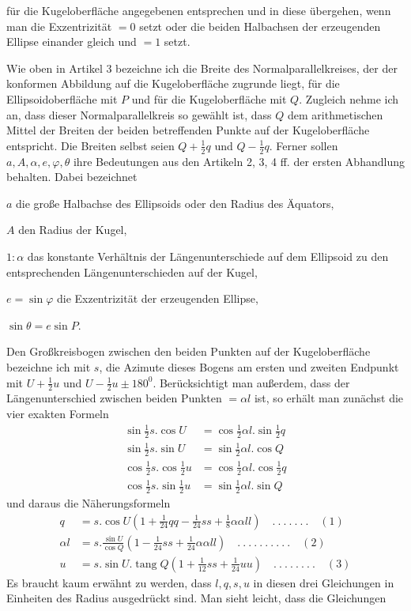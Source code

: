 %
für die Kugeloberfläche angegebenen entsprechen und in diese übergehen, wenn man die Exzentrizität \(=0\) setzt oder die beiden Halbachsen der erzeugenden Ellipse einander gleich und \(=1\) setzt.

Wie oben in Artikel 3 bezeichne ich die Breite des Normalparallelkreises, der der konformen Abbildung auf die Kugeloberfläche zugrunde liegt, für die Ellipsoidoberfläche mit \(P\) und für die Kugeloberfläche mit \(Q\). Zugleich nehme ich an, dass dieser Normalparallelkreis so gewählt ist, dass \(Q\) dem arithmetischen Mittel der Breiten der beiden betreffenden Punkte auf der Kugeloberfläche entspricht. Die Breiten selbst seien \(Q+\frac12q\) und \(Q-\frac12q\). Ferner sollen \(a,A,\alpha,e,\varphi,\theta\) ihre Bedeutungen aus den Artikeln 2, 3, 4 ff. der ersten Abhandlung behalten. Dabei bezeichnet
\begin{list}{}{\setlength{\leftmargin}{1em}\setlength{\itemindent}{0pt}\setlength{\itemsep}{0pt}\setlength{\parsep}{0pt}}
\item \(a\) die große Halbachse des Ellipsoids oder den Radius des Äquators,
\item \(A\) den Radius der Kugel,
\item \(1:\alpha\) das konstante Verhältnis der Längenunterschiede auf dem Ellipsoid zu den entsprechenden Längenunterschieden auf der Kugel,
\item \(e=\sin\varphi\) die Exzentrizität der erzeugenden Ellipse,
\item \(\sin\theta=e\sin P\).
\end{list}

\indent Den Großkreisbogen zwischen den beiden Punkten auf der Kugeloberfläche bezeichne ich mit \(s\), die Azimute dieses Bogens am ersten und zweiten Endpunkt mit \(U+\frac12u\) und \(U-\frac12u\pm180^0\). Berücksichtigt man außerdem, dass der Längenunterschied zwischen beiden Punkten \(=\alpha l\) ist, so erhält man zunächst die vier exakten Formeln
\[
\begin{aligned}
\sin\tfrac12s\mathord{.}\cos U&=\cos\tfrac12\alpha l\mathord{.}\sin\tfrac12q\\
\sin\tfrac12s\mathord{.}\sin U&=\sin\tfrac12\alpha l\mathord{.}\cos Q\\
\cos\tfrac12s\mathord{.}\cos\tfrac12u&=\cos\tfrac12\alpha l\mathord{.}\cos\tfrac12q\\
\cos\tfrac12s\mathord{.}\sin\tfrac12u&=\sin\tfrac12\alpha l\mathord{.}\sin Q
\end{aligned}
\]
und daraus die Näherungsformeln
\[
\begin{aligned}
q&=s\mathord{.}\cos U(1+\tfrac1{24}qq-\tfrac1{24}ss+\tfrac18\alpha\alpha ll)\quad .\ .\ .\ .\ .\ .\ .\quad(1)\\
\alpha l&=s\mathord{.}\frac{\sin U}{\cos Q}(1-\tfrac1{24}ss+\tfrac1{24}\alpha\alpha ll)\quad .\ .\ .\ .\ .\ .\ .\ .\ .\ .\quad(2)\\
u&=s\mathord{.}\sin U\mathord{.}\operatorname{tang}Q(1+\tfrac1{12}ss+\tfrac1{24}uu)\quad .\ .\ .\ .\ .\ .\ .\ .\quad(3)
\end{aligned}
\]
Es braucht kaum erwähnt zu werden, dass \(l,q,s,u\) in diesen drei Gleichungen in Einheiten des Radius ausgedrückt sind. Man sieht leicht, dass die Gleichungen
